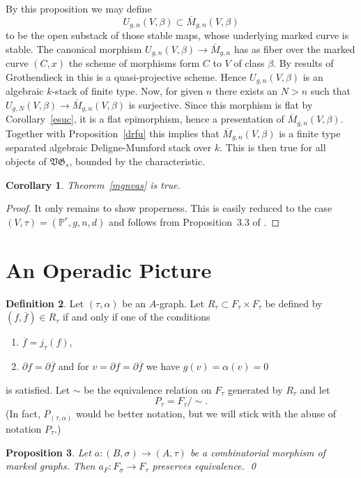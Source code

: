 \documentclass[11pt]{amsart}
\newtheorem{prop}{Proposition}[section]
\newtheorem{cor}[prop]{Corollary}
\theoremstyle{definition}
\newtheorem{defn}[prop]{Definition}
\theoremstyle{remark}
\newenvironment{pf}{\begin{proof}}{\end{proof}}
\newcommand{\GG}{{\mathfrak{G}}}
\newcommand{\VV}{{\mathfrak{V}}}
\newcommand{\pp}{{\mathbb{P}}}
\newcommand{\del}{\partial}
\newcommand{\ol}{\overline}
\renewcommand{\t}{_{\tau}}
\newcommand{\s}{_{\sigma}}
\theoremstyle{plain}
\theoremstyle{definition}
\theoremstyle{remark}
\begin{document}
By this proposition we may define
\[
U_{g,n}(V,\beta)\subset\ol{M}_{g,n}(V,\beta)
\]
to be the open substack of those stable maps, whose underlying marked curve is
stable. The canonical morphism
\(U_{g,n}(V,\beta)\rightarrow \ol{M}_{g,n}\) has as fiber over the marked curve
\((C,x)\) the scheme of morphisms form \(C\)
to \(V\) of class \(\beta\). By results of Grothendieck in \cite{fgaIV} this is a
quasi-projective scheme. Hence
\(U_{g,n}(V,\beta)\) is an algebraic \(k\)-stack of finite type. Now, for given \(n\)
there exists an \(N>n\) such that
\(U_{g,N}(V,\beta)\rightarrow\ol{M}_{g,n}(V,\beta)\)  is surjective. Since this
morphism is flat by Corollary~\ref{esuc},
it is a flat epimorphism, hence a presentation of \(\ol{M}_{g,n}(V,\beta)\).
Together with Proposition~\ref{drfu} this
implies that \(\ol{M}_{g,n}(V,\beta)\) is a finite type separated algebraic
Deligne-Mumford stack over \(k\). This is then
true for all objects of \(\VV\GG_s\), bounded by the characteristic.

\begin{cor} \label{mgnvass}
Theorem~\ref{mgnvas} is true.
\end{cor}
\begin{pf}
It only remains to show properness. This is easily reduced to the case
\((V,\tau)=(\pp^r,g,n,d)\) and follows from
Proposition~3.3 of \cite{pandh}.
\end{pf}

\section{An Operadic Picture}

\begin{defn}
Let \((\tau,\alpha)\) be an \(A\)-graph. Let \(R\t\subset F\t\times F\t\) be defined
by \((f,\ol{f})\in R\t\) if and only if one
of the conditions
\begin{enumerate}
\item \(\ol{f}=j\t(f)\),
\item \(\del f=\del\ol{f}\) and for \(v=\del f=\del\ol{f}\) we have
\(g(v)=\alpha(v)=0\)
\end{enumerate}
is satisfied. Let \(\sim\) be the equivalence relation on \(F\t\) generated by
\(R\t\) and let
\[
P\t=F\t/\sim.
\]
(In fact, \(P_{(\tau,\alpha)}\) would be better notation, but we will stick with
the abuse of notation \(P_{\tau}\).)
\end{defn}

\begin{prop} \label{cmmgpe}
Let \(a:(B,\sigma)\rightarrow(A,\tau)\) be a combinatorial morphism of marked
graphs. Then \(a_F:F\s\rightarrow F\t\)
preserves equivalence.  \qed
\end{prop}
\end{document}
